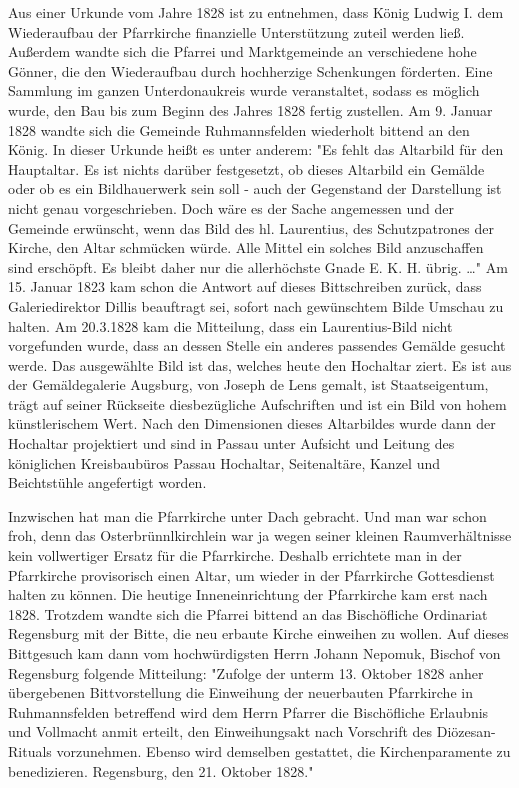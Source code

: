 \documentclass{book}
\begin{document}
Aus einer Urkunde vom Jahre 1828 ist zu entnehmen, dass König Ludwig I. dem
Wiederaufbau der Pfarrkirche finanzielle Unterstützung zuteil werden ließ.
Außerdem wandte sich die Pfarrei und Marktgemeinde an verschiedene hohe Gönner,
die den Wiederaufbau durch hochherzige Schenkungen förderten. Eine Sammlung im
ganzen Unterdonaukreis wurde veranstaltet, sodass es möglich wurde, den Bau bis
zum Beginn des Jahres 1828 fertig zustellen. Am 9. Januar 1828 wandte sich die
Gemeinde Ruhmannsfelden wiederholt bittend an den König. In dieser Urkunde heißt
es unter anderem: "Es fehlt das Altarbild für den Hauptaltar. Es ist nichts
darüber festgesetzt, ob dieses Altarbild ein Gemälde oder ob es ein
Bildhauerwerk sein soll - auch der Gegenstand der Darstellung ist nicht genau
vorgeschrieben. Doch wäre es der Sache angemessen und der Gemeinde erwünscht,
wenn das Bild des hl. Laurentius, des Schutzpatrones der Kirche, den Altar
schmücken würde. Alle Mittel ein solches Bild anzuschaffen sind erschöpft. Es
bleibt daher nur die allerhöchste Gnade E. K. H. übrig. …" Am 15. Januar 1823
kam schon die Antwort auf dieses Bittschreiben zurück, dass Galeriedirektor
Dillis beauftragt sei, sofort nach gewünschtem Bilde Umschau zu halten. Am
20.3.1828 kam die Mitteilung, dass ein Laurentius-Bild nicht vorgefunden wurde,
dass an dessen Stelle ein anderes passendes Gemälde gesucht werde. Das
ausgewählte Bild ist das, welches heute den Hochaltar ziert. Es ist aus der
Gemäldegalerie Augsburg, von Joseph de Lens gemalt, ist Staatseigentum, trägt
auf seiner Rückseite diesbezügliche Aufschriften und ist ein Bild von hohem
künstlerischem Wert. Nach den Dimensionen dieses Altarbildes wurde dann der
Hochaltar projektiert und sind in Passau unter Aufsicht und Leitung des
königlichen Kreisbaubüros Passau Hochaltar, Seitenaltäre, Kanzel und
Beichtstühle angefertigt worden.

Inzwischen hat man die Pfarrkirche unter Dach gebracht. Und man war schon froh,
denn das Osterbrünnlkirchlein war ja wegen seiner kleinen Raumverhältnisse kein
vollwertiger Ersatz für die Pfarrkirche. Deshalb errichtete man in der
Pfarrkirche provisorisch einen Altar, um wieder in der Pfarrkirche Gottesdienst
halten zu können. Die heutige Inneneinrichtung der Pfarrkirche kam erst nach
1828. Trotzdem wandte sich die Pfarrei bittend an das Bischöfliche Ordinariat
Regensburg mit der Bitte, die neu erbaute Kirche einweihen zu wollen. Auf dieses
Bittgesuch kam dann vom hochwürdigsten Herrn Johann Nepomuk, Bischof von
Regensburg folgende Mitteilung: "Zufolge der unterm 13. Oktober 1828 anher
übergebenen Bittvorstellung die Einweihung der neuerbauten Pfarrkirche in
Ruhmannsfelden betreffend wird dem Herrn Pfarrer die Bischöfliche Erlaubnis und
Vollmacht anmit erteilt, den Einweihungsakt nach Vorschrift des Diözesan-Rituals
vorzunehmen. Ebenso wird demselben gestattet, die Kirchenparamente zu
benedizieren. Regensburg, den 21. Oktober 1828."
\end{document}
